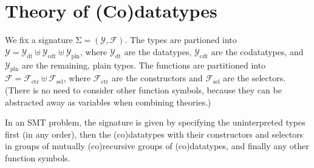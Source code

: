 \documentclass[a4paper,oribibl,envcountsame,draft]{llncs}
\newcommand\Sig{\mathrm{\Sigma}}
\newcommand\ty[1]{\textit{#1}}
\newcommand\Types{\mathcal{Y}}
\newcommand\Funcs{\mathcal{F}}
\newcommand\Data{\Types_{\mathrm{dt}}}
\newcommand\Codata{\Types_{\mathrm{cdt}}}
\newcommand\Nondata{\Types_{\mathrm{pln}}}
\newcommand\Ctr{\Funcs_{\mathrm{ctr}}}
\newcommand\Sel{\Funcs_{\mathrm{sel}}}
\begin{document}

\section{Theory of (Co)datatypes}
\label{sec:theory-of-co-datatypes}

We fix a signature $\Sig = (\Types, \Funcs)$. The types are partioned into
$\Types = \Data \mathrel{\uplus} \Codata \mathrel{\uplus} \Nondata$, where $\Data$ are the
datatypes, $\Codata$ are the codatatypes, and $\Nondata$ are the remaining,
plain types. The functions are partitioned into $\Funcs = \Ctr \mathrel{\uplus} \Sel$, where
$\Ctr$ are the constructors and $\Sel$ are the selectors. (There is no need to
consider other function symbols, because they can be abstracted away as
variables when combining theories.)

In an SMT problem, the signature is given by specifying the uninterpreted types
first (in any order), then the (co)datatypes with their constructors and
selectors in groups of mutually (co)recursive groups of (co)datatypes, and
finally any other function symbols.
\end{document}
